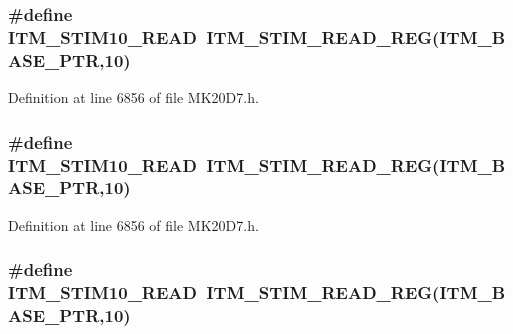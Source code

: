 \subsubsection[{\texorpdfstring{I\+T\+M\+\_\+\+S\+T\+I\+M10\+\_\+\+R\+E\+AD}{ITM_STIM10_READ}}]{\setlength{\rightskip}{0pt plus 5cm}\#define I\+T\+M\+\_\+\+S\+T\+I\+M10\+\_\+\+R\+E\+AD~{\bf I\+T\+M\+\_\+\+S\+T\+I\+M\+\_\+\+R\+E\+A\+D\+\_\+\+R\+EG}({\bf I\+T\+M\+\_\+\+B\+A\+S\+E\+\_\+\+P\+TR},10)}\hypertarget{group___i_t_m___register___accessor___macros_gac52c9a2197fa51dd2395e68ce8f77f21}{}\label{group___i_t_m___register___accessor___macros_gac52c9a2197fa51dd2395e68ce8f77f21}


Definition at line 6856 of file M\+K20\+D7.\+h.

\subsubsection[{\texorpdfstring{I\+T\+M\+\_\+\+S\+T\+I\+M10\+\_\+\+R\+E\+AD}{ITM_STIM10_READ}}]{\setlength{\rightskip}{0pt plus 5cm}\#define I\+T\+M\+\_\+\+S\+T\+I\+M10\+\_\+\+R\+E\+AD~{\bf I\+T\+M\+\_\+\+S\+T\+I\+M\+\_\+\+R\+E\+A\+D\+\_\+\+R\+EG}({\bf I\+T\+M\+\_\+\+B\+A\+S\+E\+\_\+\+P\+TR},10)}\hypertarget{group___i_t_m___register___accessor___macros_gac52c9a2197fa51dd2395e68ce8f77f21}{}\label{group___i_t_m___register___accessor___macros_gac52c9a2197fa51dd2395e68ce8f77f21}


Definition at line 6856 of file M\+K20\+D7.\+h.

\subsubsection[{\texorpdfstring{I\+T\+M\+\_\+\+S\+T\+I\+M10\+\_\+\+R\+E\+AD}{ITM_STIM10_READ}}]{\setlength{\rightskip}{0pt plus 5cm}\#define I\+T\+M\+\_\+\+S\+T\+I\+M10\+\_\+\+R\+E\+AD~{\bf I\+T\+M\+\_\+\+S\+T\+I\+M\+\_\+\+R\+E\+A\+D\+\_\+\+R\+EG}({\bf I\+T\+M\+\_\+\+B\+A\+S\+E\+\_\+\+P\+TR},10)}\hypertarget{group___i_t_m___register___accessor___macros_gac52c9a2197fa51dd2395e68ce8f77f21}{}\label{group___i_t_m___register___accessor___macros_gac52c9a2197fa51dd2395e68ce8f77f21}


